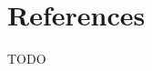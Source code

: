 \documentclass[a4paper,USenglish,cleveref, autoref]{lipics-v2019}
\theoremstyle{definition}
\begin{document}
\section{References}
TODO
\end{document}
